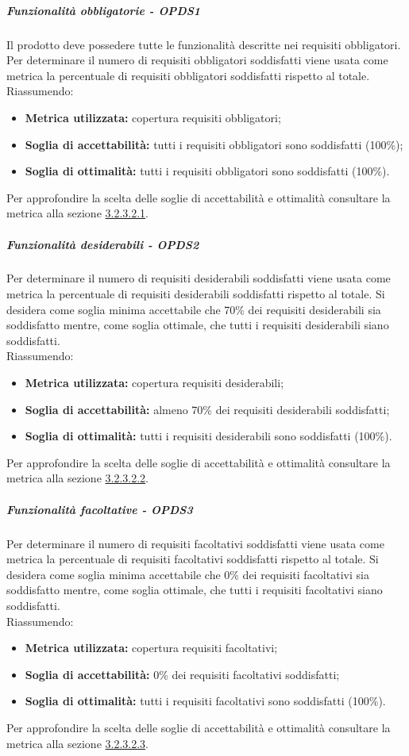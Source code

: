 \documentclass[PianoDiQualifica.tex]{subfiles}
\begin{document}
				\subparagraph{Funzionalità obbligatorie - OPDS1}
				Il prodotto deve possedere tutte le funzionalità descritte nei requisiti obbligatori. Per determinare il numero di requisiti obbligatori soddisfatti viene usata
				come metrica la percentuale di requisiti obbligatori soddisfatti rispetto al totale. \\
				Riassumendo:
				\begin{itemize}
				\item \textbf{Metrica utilizzata:} copertura requisiti obbligatori;
				\item \textbf{Soglia di accettabilità:} tutti i requisiti obbligatori sono soddisfatti (100\%);
				\item \textbf{Soglia di ottimalità:} tutti i requisiti obbligatori sono soddisfatti (100\%).
				\end{itemize}
				Per approfondire la scelta delle soglie di accettabilità e ottimalità consultare la metrica alla sezione \hyperlink{req_obbligatori}{3.2.3.2.1}.

				\subparagraph{Funzionalità desiderabili - OPDS2}
				Per determinare il numero di requisiti desiderabili soddisfatti viene usata come metrica la percentuale di requisiti desiderabili soddisfatti rispetto al totale.
				Si desidera come soglia minima accettabile che 70\% dei requisiti desiderabili sia soddisfatto mentre, come soglia ottimale, che tutti i requisiti desiderabili siano soddisfatti. \\
				Riassumendo:
				\begin{itemize}
				\item \textbf{Metrica utilizzata:} copertura requisiti desiderabili;
				\item \textbf{Soglia di accettabilità:} almeno 70\% dei requisiti desiderabili soddisfatti;
				\item \textbf{Soglia di ottimalità:} tutti i requisiti desiderabili sono soddisfatti (100\%).
				\end{itemize}
				Per approfondire la scelta delle soglie di accettabilità e ottimalità consultare la metrica alla sezione \hyperlink{req_desiderabili}{3.2.3.2.2}.


				\subparagraph{Funzionalità facoltative - OPDS3}
				Per determinare il numero di requisiti facoltativi soddisfatti viene usata come metrica la percentuale di requisiti facoltativi soddisfatti rispetto al totale.
				Si desidera come soglia minima accettabile che 0\% dei requisiti facoltativi sia soddisfatto mentre, come soglia ottimale, che tutti i requisiti facoltativi siano soddisfatti. \\
				Riassumendo:
				\begin{itemize}
				\item \textbf{Metrica utilizzata:} copertura requisiti facoltativi;
				\item \textbf{Soglia di accettabilità:}  0\% dei requisiti facoltativi soddisfatti;
				\item \textbf{Soglia di ottimalità:} tutti i requisiti facoltativi sono soddisfatti (100\%).
				\end{itemize}
				Per approfondire la scelta delle soglie di accettabilità e ottimalità consultare la metrica alla sezione \hyperlink{req_facoltativi}{3.2.3.2.3}.
\end{document}
